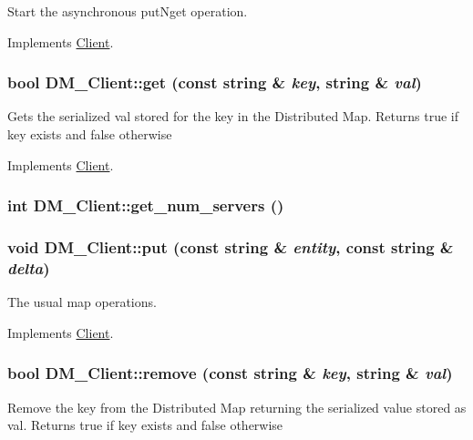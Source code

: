Start the asynchronous putNget operation. 



Implements \hyperlink{class_client_a3c7e1cbb61e8a9b2c5c89de884f22253}{Client}.

\hypertarget{class_d_m___client_aef212e65cee0c1cd11f9480e68f923cd}{
\subsubsection[{get}]{\setlength{\rightskip}{0pt plus 5cm}bool DM\_\-Client::get (const string \& {\em key}, \/  string \& {\em val})}}
\label{class_d_m___client_aef212e65cee0c1cd11f9480e68f923cd}
Gets the serialized val stored for the key in the Distributed Map. Returns true if key exists and false otherwise 

Implements \hyperlink{class_client_aa1e3f5566dadd85d3ac575c7978f65ea}{Client}.

\hypertarget{class_d_m___client_a6064058c7470f12b8825b1482db08331}{
\subsubsection[{get\_\-num\_\-servers}]{\setlength{\rightskip}{0pt plus 5cm}int DM\_\-Client::get\_\-num\_\-servers ()}}
\label{class_d_m___client_a6064058c7470f12b8825b1482db08331}
\hypertarget{class_d_m___client_a8285b5edb01bfe9325d887a4bb4e17d7}{
\subsubsection[{put}]{\setlength{\rightskip}{0pt plus 5cm}void DM\_\-Client::put (const string \& {\em entity}, \/  const string \& {\em delta})}}
\label{class_d_m___client_a8285b5edb01bfe9325d887a4bb4e17d7}


The usual map operations. 



Implements \hyperlink{class_client_a7369bb878f12a07b717638efb5871668}{Client}.

\hypertarget{class_d_m___client_a856f11737f8dce9f842256a3391b084b}{
\subsubsection[{remove}]{\setlength{\rightskip}{0pt plus 5cm}bool DM\_\-Client::remove (const string \& {\em key}, \/  string \& {\em val})}}
\label{class_d_m___client_a856f11737f8dce9f842256a3391b084b}
Remove the key from the Distributed Map returning the serialized value stored as val. Returns true if key exists and false otherwise 

